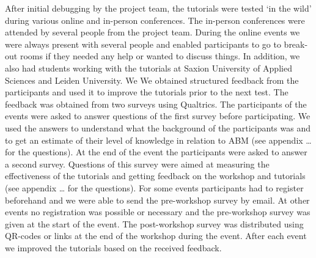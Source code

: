 \documentclass[
]{article}
\begin{document}
After initial debugging by the project team, the tutorials were tested `in the wild' during various online and in-person conferences. The in-person conferences were attended by several people from the project team. During the online events we were always present with several people and enabled participants to go to break-out rooms if they needed any help or wanted to discuss things. In addition, we also had students working with the tutorials at Saxion University of Applied Sciences and Leiden University. We We obtained structured feedback from the participants and used it to improve the tutorials prior to the next test. The feedback was obtained from two surveys using Qualtrics. The participants of the events were asked to answer questions of the first survey before participating. We used the answers to understand what the background of the participants was and to get an estimate of their level of knowledge in relation to ABM (see appendix \ldots{} for the questions). At the end of the event the participants were asked to answer a second survey. Questions of this survey were aimed at measuring the effectiveness of the tutorials and getting feedback on the workshop and tutorials (see appendix \ldots{} for the questions). For some events participants had to register beforehand and we were able to send the pre-workshop survey by email. At other events no registration was possible or necessary and the pre-workshop survey was given at the start of the event. The post-workshop survey was distributed using QR-codes or links at the end of the workshop during the event. After each event we improved the tutorials based on the received feedback.
\end{document}
